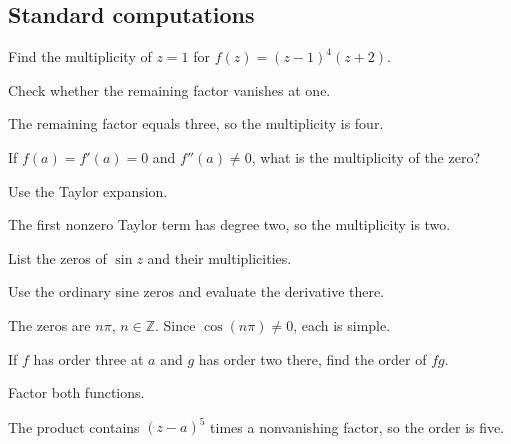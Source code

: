 \subsection*{Standard computations}

\begin{exercise}\label{exr:iv07-expand-01}
Find the multiplicity of \(z=1\) for \(f(z)=(z-1)^4(z+2)\).
\end{exercise}
\begin{hint}
Check whether the remaining factor vanishes at one.
\end{hint}
\begin{solution}
The remaining factor equals three, so the multiplicity is four.
\end{solution}

\begin{exercise}\label{exr:iv07-expand-02}
If \(f(a)=f'(a)=0\) and \(f''(a)\ne0\), what is the multiplicity of the zero?
\end{exercise}
\begin{hint}
Use the Taylor expansion.
\end{hint}
\begin{solution}
The first nonzero Taylor term has degree two, so the multiplicity is two.
\end{solution}

\begin{exercise}\label{exr:iv07-expand-03}
List the zeros of \(\sin z\) and their multiplicities.
\end{exercise}
\begin{hint}
Use the ordinary sine zeros and evaluate the derivative there.
\end{hint}
\begin{solution}
The zeros are \(n\pi\), \(n\in\mathbb Z\). Since \(\cos(n\pi)\ne0\), each is simple.
\end{solution}

\begin{exercise}\label{exr:iv07-expand-04}
If \(f\) has order three at \(a\) and \(g\) has order two there, find the order of \(fg\).
\end{exercise}
\begin{hint}
Factor both functions.
\end{hint}
\begin{solution}
The product contains \((z-a)^5\) times a nonvanishing factor, so the order is five.
\end{solution}

